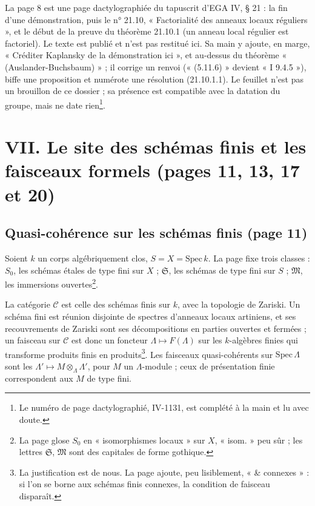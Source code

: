 \documentclass[11pt,a4paper]{article}
\begin{document}
La page 8 est une page dactylographiée du tapuscrit d'EGA IV, § 21 : la fin
d'une démonstration, puis le n° 21.10, « Factorialité des anneaux locaux
réguliers », et le début de la preuve du théorème 21.10.1 (un anneau local
régulier est factoriel). Le texte est publié et n'est pas restitué ici. Sa
main y ajoute, en marge, « Créditer Kaplansky de la démonstration ici », et
au-dessus du théorème « (Auslander-Buchsbaum) » ; il corrige un renvoi
(« (5.11.6) » devient « I 9.4.5 »), biffe une proposition et numérote une
résolution (21.10.1.1). Le feuillet n'est pas un brouillon de ce dossier ; sa
présence est compatible avec la datation du groupe, mais ne date
rien\footnote{Le numéro de page dactylographié, IV-1131, est complété à la
main et lu avec doute.}.

\section*{VII. Le site des schémas finis et les faisceaux formels (pages 11, 13, 17 et 20)}

\subsection*{Quasi-cohérence sur les schémas finis (page 11)}

Soient $k$ un corps algébriquement clos, $S = X = \mathrm{Spec}\, k$. La page
fixe trois classes : $S_0$, les schémas étales de type fini sur $X$ ;
$\mathfrak{S}$, les schémas de type fini sur $S$ ; $\mathfrak{M}$, les
immersions ouvertes\footnote{La page glose $S_0$ en « isomorphismes locaux »
sur $X$, « isom. » peu sûr ; les lettres $\mathfrak{S}$, $\mathfrak{M}$ sont des capitales de
forme gothique.}.

La catégorie $\mathcal{C}$ est celle des schémas finis sur $k$, avec la
topologie de Zariski. Un schéma fini est réunion disjointe de spectres
d'anneaux locaux artiniens, et ses recouvrements de Zariski sont ses
décompositions en parties ouvertes et fermées ; un faisceau sur $\mathcal{C}$
est donc un foncteur $\Lambda \mapsto F(\Lambda)$ sur les $k$-algèbres finies
qui transforme produits finis en produits\footnote{La justification est de
nous. La page ajoute, peu lisiblement, « \& connexes » : si l'on se borne aux
schémas finis connexes, la condition de faisceau disparaît.}. Les faisceaux
quasi-cohérents sur $\mathrm{Spec}\, \Lambda$ sont les
$\Lambda' \mapsto M \otimes_\Lambda \Lambda'$, pour $M$ un $\Lambda$-module ;
ceux de présentation finie correspondent aux $M$ de type fini.
\end{document}
